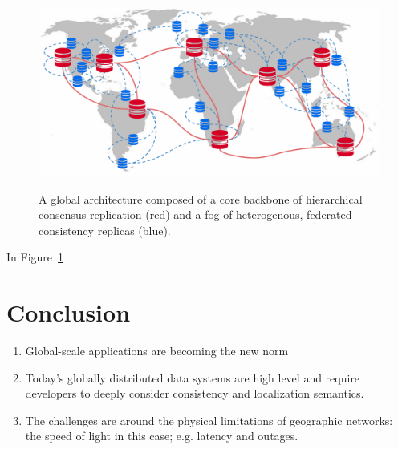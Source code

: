 \begin{figure}
    \begin{center}
        \includegraphics[width=5in]{figures/ch02_global_architecture.pdf}
    \end{center}
    \renewcommand{\baselinestretch}{1}
    \small\normalsize

    \begin{quote}
        \caption[Global Architecture]{A global architecture composed of a core backbone of hierarchical consensus replication (red) and a fog of heterogenous, federated consistency replicas (blue).}
        \label{fig:ch02_global_architecture}
    \end{quote}
\end{figure}
\renewcommand{\baselinestretch}{2}
\small\normalsize

In Figure~\ref{fig:ch02_global_architecture}

\section{Conclusion}

\begin{enumerate}
    \item Global-scale applications are becoming the new norm
    \item Today's globally distributed data systems are high level and require developers to deeply consider consistency and localization semantics.
    \item The challenges are around the physical limitations of geographic networks: the speed of light in this case; e.g. latency and outages.

\end{enumerate}
